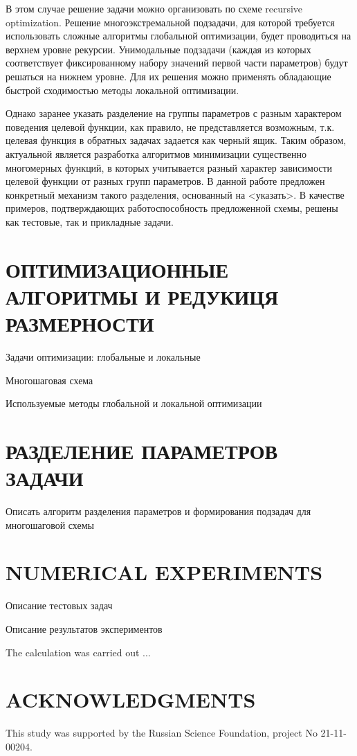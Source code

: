 \documentclass{aip-cp}
\begin{document}
В этом случае решение задачи можно организовать по схеме recursive optimization. Решение  многоэкстремальной подзадачи, для которой требуется использовать сложные алгоритмы глобальной оптимизации, будет проводиться на верхнем уровне рекурсии.
Унимодальные подзадачи (каждая из которых соответствует фиксированному набору значений первой части параметров) будут решаться на нижнем уровне. Для их решения можно применять обладающие быстрой сходимостью методы локальной оптимизации.

Однако заранее указать разделение на группы параметров с разным характером поведения целевой функции, как правило, не представляется возможным, т.к. целевая функция в обратных задачах задается как черный ящик. 
Таким образом, актуальной является разработка алгоритмов минимизации существенно многомерных функций, в которых учитывается разный характер зависимости целевой функции от разных групп параметров. 
В данной работе предложен конкретный механизм такого разделения, основанный на <указать>.
В качестве примеров, подтверждающих работоспособность предложенной схемы, решены как тестовые, так и прикладные задачи.

\section{ОПТИМИЗАЦИОННЫЕ АЛГОРИТМЫ И РЕДУКИЦЯ РАЗМЕРНОСТИ}

Задачи оптимизации: глобальные и локальные

Многошаговая схема 

Используемые методы глобальной и локальной оптимизации

\section{РАЗДЕЛЕНИЕ ПАРАМЕТРОВ ЗАДАЧИ}

Описать алгоритм разделения параметров и формирования подзадач для многошаговой схемы

\section{NUMERICAL EXPERIMENTS}

Описание тестовых задач

Описание результатов экспериментов


The calculation was carried out ...

\section{ACKNOWLEDGMENTS}
This study was supported by the Russian Science Foundation, project No 21-11-00204.




%
%
\end{document}
